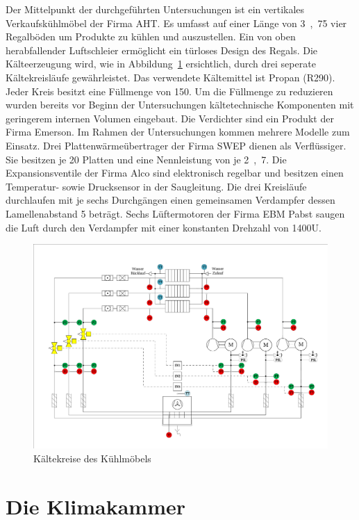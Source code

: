 Der Mittelpunkt der durchgeführten Untersuchungen ist ein vertikales Verkaufskühlmöbel der Firma AHT.
Es umfasst auf einer Länge von \unit{3,75}{\metre} vier Regalböden um Produkte zu kühlen und auszustellen. Ein von oben herabfallender Luftschleier ermöglicht ein türloses Design des Regals. Die Kälteerzeugung wird, wie in Abbildung~\ref{fig:IDC150} ersichtlich, durch drei seperate Kältekreisläufe gewährleistet. Das verwendete Kältemittel ist Propan (R290). Jeder Kreis besitzt eine Füllmenge von \unit{150}{\gram}. Um die Füllmenge zu reduzieren wurden bereits vor Beginn der Untersuchungen kältetechnische Komponenten mit geringerem internen Volumen eingebaut. Die Verdichter sind ein Produkt der Firma Emerson. Im Rahmen der Untersuchungen kommen mehrere Modelle zum Einsatz. Drei Plattenwärmeübertrager der Firma SWEP dienen als Verflüssiger. Sie besitzen je 20 Platten und eine Nennleistung von je \unit{2,7}{\kilo\watt}. Die Expansionsventile der Firma Alco sind elektronisch regelbar und besitzen einen Temperatur- sowie Drucksensor in der Saugleitung. Die drei Kreisläufe durchlaufen mit je sechs Durchgängen einen gemeinsamen Verdampfer dessen Lamellenabstand \unit{5}{\milli\metre} beträgt. Sechs Lüftermotoren der Firma EBM Pabst saugen die Luft durch den Verdampfer mit einer konstanten Drehzahl von \unit{1400}{U\per\min}.

\begin{figure} %
\centering
\includegraphics[scale=.5,angle=90]{Pictures/IDC150.pdf}
\caption{Kältekreise des Kühlmöbels}
\label{fig:IDC150}
\end{figure}


\section{Die Klimakammer}
\label{sec:Die Klimakammer}

